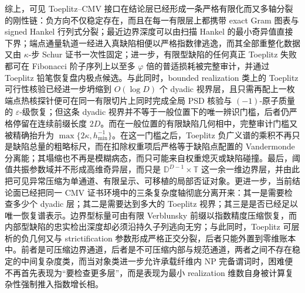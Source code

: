 





综上，可见 Toeplitz--CMV 接口在结论层已经形成一条严格有限化而又多轴分裂的刚性链：负方向不仅稳定存在，而且在每一有限层上都携带 exact Gram 图表与 signed Hankel 行列式分裂；最近边界深度可以由扫描 Hankel 的最小奇异值直接下界；端点通量轨道一经进入真缺陷相便以严格指数律逃逸，而其全部重整化数据又由 \(\kappa\)-步 Schur 证书一次性固定；进一步，有限型缺陷的任何真正 Toeplitz 失败都可在 Fibonacci 阶子序列上以至多 \(\varphi\) 倍的普适损耗被完整审计，并通过 Toeplitz 铅笔恢复盘内极点候选。与此同时，bounded realization 类上的 Toeplitz 可行性核验已经进一步坍缩到 \(O(\log D)\) 个 dyadic 视界层，且只需再配上一枚端点热核探针便可在同一有限切片上同时完成全局 PSD 核验与 \((-1)\)-原子质量的 \(\varepsilon\)-级恢复；但这条 dyadic 视界并不等于一般位置下的唯一辨识门槛，后者仍严格停留在连续前缀长度 \(2D\)。而在一般位置的有限缺陷几何相中，完整审计门槛又被精确抬升为 \(\max\{2\kappa,h_{\min}^{-1}\}\)。在这一门槛之后，Toeplitz 负广义谱的乘积不再只是缺陷总量的粗略标尺，而在扣除权重项后严格等于缺陷点配置的 Vandermonde 分离能；其塌缩也不再是模糊病态，而只可能来自权重熄灭或缺陷碰撞。最后，阈值共振参数域并不形成高维奇异层，而只是 \(\mathbb D^{D-1}\times\mathbb T\) 这一余一维边界层，并由此把可见异常压缩为单通道、有限呈示、可移植的局部否证对象。更进一步，当前结论面已经把同一 CMV 证书环境中的三条复杂度轴彻底分离开来：其一是需要检查多少个 dyadic 层；其二是需要达到多大的 Toeplitz 视界；其三是是否已经足以唯一恢复谱表示。边界型标量可由有限 Verblunsky 前缀以指数精度压缩恢复，而内部型缺陷的忠实检出深度却必须沿持久子列逃向无穷；与此同时，Toeplitz 可层析的负几何又与 strictification 参数形成严格正交分裂，后者只能外置到零维账本中。前者是可压缩边界通道，后者是不可压缩内部与规范通道，两者之间不存在稳定的中间复杂度类，而当对象类进一步允许承载纤维内 NP 完备谓词时，困难便不再首先表现为“要检查更多层”，而是表现为最小 realization 维数自身被计算复杂性强制推入指数增长相。

\endinput
